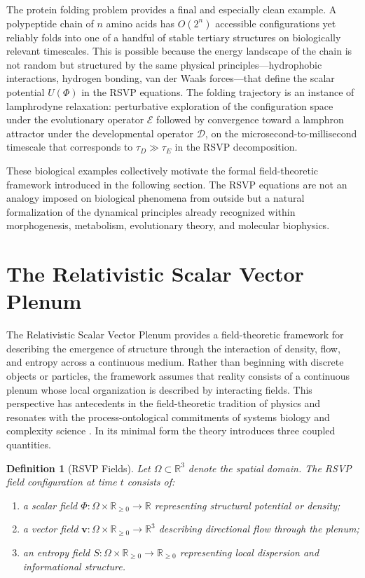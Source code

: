 \documentclass[12pt]{article}
\newtheorem{definition}{Definition}[section]
\begin{document}
The protein folding problem \cite{kauffman1993} provides a final and especially clean example. A polypeptide chain of $n$ amino acids has $O(2^n)$ accessible configurations yet reliably folds into one of a handful of stable tertiary structures on biologically relevant timescales. This is possible because the energy landscape of the chain is not random but structured by the same physical principles---hydrophobic interactions, hydrogen bonding, van der Waals forces---that define the scalar potential $U(\Phi)$ in the RSVP equations. The folding trajectory is an instance of lamphrodyne relaxation: perturbative exploration of the configuration space under the evolutionary operator $\mathcal{E}$ followed by convergence toward a lamphron attractor under the developmental operator $\mathcal{D}$, on the microsecond-to-millisecond timescale that corresponds to $\tau_D \gg \tau_E$ in the RSVP decomposition.

These biological examples collectively motivate the formal field-theoretic framework introduced in the following section. The RSVP equations are not an analogy imposed on biological phenomena from outside but a natural formalization of the dynamical principles already recognized within morphogenesis, metabolism, evolutionary theory, and molecular biophysics.

\section{The Relativistic Scalar Vector Plenum}
\label{sec:rsvp}

The Relativistic Scalar Vector Plenum provides a field-theoretic framework for describing the emergence of structure through the interaction of density, flow, and entropy across a continuous medium. Rather than beginning with discrete objects or particles, the framework assumes that reality consists of a continuous plenum whose local organization is described by interacting fields. This perspective has antecedents in the field-theoretic tradition of physics and resonates with the process-ontological commitments of systems biology and complexity science \cite{prigogine1984,haken1983,smithmorowitz2016}. In its minimal form the theory introduces three coupled quantities.

\begin{definition}[RSVP Fields]
Let $\Omega \subset \mathbb{R}^3$ denote the spatial domain. The RSVP field configuration at time $t$ consists of:
\begin{enumerate}
\renewcommand{\labelenumi}{(\roman{enumi})}
\item a scalar field $\Phi : \Omega \times \mathbb{R}_{\geq 0} \to \mathbb{R}$ representing structural potential or density;
\item a vector field $\mathbf{v} : \Omega \times \mathbb{R}_{\geq 0} \to \mathbb{R}^3$ describing directional flow through the plenum;
\item an entropy field $S : \Omega \times \mathbb{R}_{\geq 0} \to \mathbb{R}_{\geq 0}$ representing local dispersion and informational structure.
\end{enumerate}
\end{definition}
\end{document}

